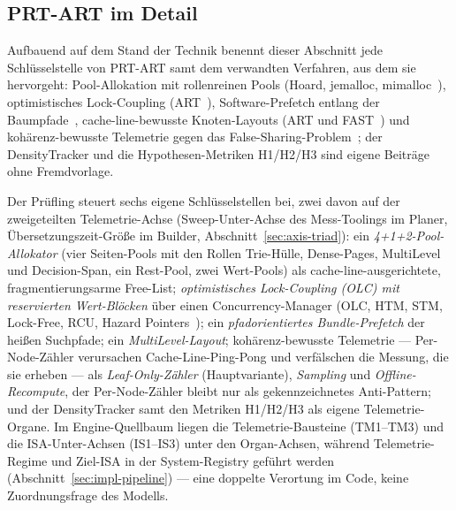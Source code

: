 \begin{nurkurz}
\section{PRT-ART im Detail}\label{sec:prtart-impl}
Aufbauend auf dem Stand der Technik benennt dieser Abschnitt jede Schlüsselstelle von PRT-ART samt dem
verwandten Verfahren, aus dem sie hervorgeht: Pool-Allokation mit rollenreinen Pools (Hoard, jemalloc,
mimalloc~\cite{berger2000hoard,evans2006jemalloc,leijen2019mimalloc}), optimistisches Lock-Coupling
(ART~\cite{leis2016olc}), Software-Prefetch entlang der
Baumpfade~\cite{chen2001prefetch,zhang2025hierarchical}, cache-line-bewusste Knoten-Layouts (ART und
FAST~\cite{leis2013art,kim2010fast}) und kohärenz-bewusste Telemetrie gegen das
False-Sharing-Problem~\cite{torrellas1994falsesharing,kuehn2023bplustree}; der DensityTracker und die
Hypothesen-Metriken H1/H2/H3 sind eigene Beiträge ohne Fremdvorlage.

Der Prüfling steuert sechs eigene Schlüsselstellen bei, zwei davon auf der zweigeteilten Telemetrie-Achse
(Sweep-Unter-Achse des Mess-Toolings im Planer, Übersetzungszeit-Größe im Builder,
Abschnitt~\ref{sec:axis-triad}): ein \emph{4+1+2-Pool-Allokator} (vier Seiten-Pools mit den Rollen
Trie-Hülle, Dense-Pages, MultiLevel und Decision-Span, ein Rest-Pool, zwei Wert-Pools) als
cache-line-ausgerichtete, fragmentierungsarme Free-List; \emph{optimistisches Lock-Coupling (OLC) mit
reservierten Wert-Blöcken} über einen Concurrency-Manager (OLC, HTM, STM, Lock-Free, RCU, Hazard
Pointers~\cite{michael2004hazard}); ein \emph{pfadorientiertes Bundle-Prefetch} der heißen Suchpfade; ein
\emph{MultiLevel-Layout}; kohärenz-bewusste Telemetrie --- Per-Node-Zähler verursachen
Cache-Line-Ping-Pong und verfälschen die Messung, die sie erheben --- als \emph{Leaf-Only-Zähler}
(Hauptvariante), \emph{Sampling} und \emph{Offline-Recompute}, der Per-Node-Zähler bleibt nur als
gekennzeichnetes Anti-Pattern; und der DensityTracker samt den Metriken H1/H2/H3 als eigene
Telemetrie-Organe. Im Engine-Quellbaum liegen die Telemetrie-Bausteine (TM1--TM3) und die
ISA-Unter-Achsen (IS1--IS3) unter den Organ-Achsen, während Telemetrie-Regime und Ziel-ISA in der
System-Registry geführt werden (Abschnitt~\ref{sec:impl-pipeline}) --- eine doppelte Verortung im Code,
keine Zuordnungsfrage des Modells.


\end{nurkurz}
